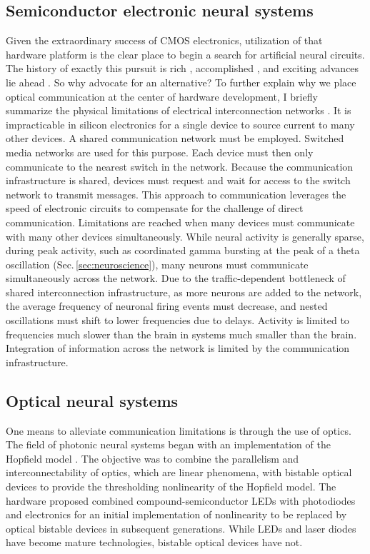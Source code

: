 \documentclass[twocolumn]{article}
\begin{document}
\subsection{Semiconductor electronic neural systems}
Given the extraordinary success of CMOS electronics, utilization of that hardware platform is the clear place to begin a search for artificial neural circuits. The history of exactly this pursuit is rich \cite{me1989,me1990,lide2015}, accomplished \cite{voma2007,inli2011,chst2014,aast2018,boro2018}, and exciting advances lie ahead \cite{stin2019}. So why advocate for an alternative? To further explain why we place optical communication at the center of hardware development, I briefly summarize the physical limitations of electrical interconnection networks \cite{hepa2012}. It is impracticable in silicon electronics for a single device to source current to many other devices. A shared communication network must be employed. Switched media networks are used for this purpose. Each device must then only communicate to the nearest switch in the network. Because the communication infrastructure is shared, devices must request and wait for access to the switch network to transmit messages. This approach to communication leverages the speed of electronic circuits to compensate for the challenge of direct communication. Limitations are reached when many devices must communicate with many other devices simultaneously. While neural activity is generally sparse, during peak activity, such as coordinated gamma bursting at the peak of a theta oscillation (Sec.\,\ref{sec:neuroscience}), many neurons must communicate simultaneously across the network. Due to the traffic-dependent bottleneck of shared interconnection infrastructure, as more neurons are added to the network, the average frequency of neuronal firing events must decrease, and nested oscillations must shift to lower frequencies due to delays. Activity is limited to frequencies much slower than the brain in systems much smaller than the brain. Integration of information across the network is limited by the communication infrastructure.

\subsection{Optical neural systems}
One means to alleviate communication limitations is through the use of optics. The field of photonic neural systems began \cite{psfa1985,faps1985} with an implementation of the Hopfield model \cite{ho1982}. The objective was to combine the parallelism and interconnectability of optics, which are linear phenomena, with bistable optical devices to provide the thresholding nonlinearity of the Hopfield model. The hardware proposed combined compound-semiconductor LEDs with photodiodes and electronics for an initial implementation of nonlinearity to be replaced by optical bistable devices in subsequent generations. While LEDs and laser diodes have become mature technologies, bistable optical devices have not.
\end{document}
